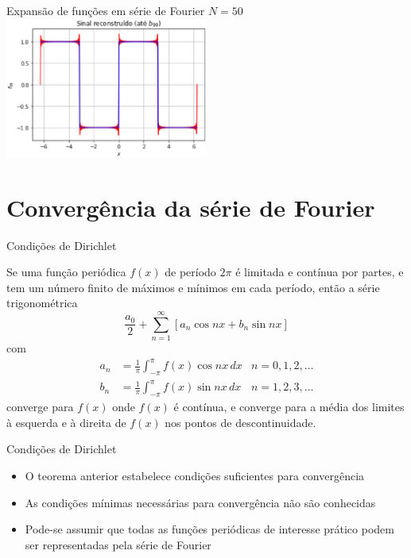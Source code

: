 \begin{slide}[toc=]{Expansão de funções em série de Fourier}
{		      $N=50$~\includegraphics[width=0.5\textwidth]{figs/b99}
		      }
      \end{slide}

      \section[slide=true]{Convergência da série de Fourier}
      \begin{slide}[toc=]{Condições de Dirichlet}
	      \begin{theorem}
		      Se uma função periódica $f(x)$ de período $2\pi$ é limitada e contínua por partes, e tem um número finito de máximos e mínimos em cada período, então a série trigonométrica
			      \begin{equation*}
				      \frac{a_0}{2}+ \sum_{n=1}^\infty \left [ a_n\cos nx  + b_n\sin nx \right ]
			      \end{equation*}
		com 
					      \begin{align*}
						      a_n &= \frac{1}{\pi}\int_{-\pi}^\pi f(x)\cos nx\, dx & n=0,1,2,\dots\\
						      b_n &= \frac{1}{\pi}\int_{-\pi}^\pi f(x)\sin nx\, dx & n=1,2,3,\dots
					      \end{align*}
			converge para $f(x)$ onde $f(x)$ é contínua, e converge para a média dos limites à esquerda e à direita de $f(x)$ nos pontos de descontinuidade.
	      \end{theorem}
      \end{slide}
      
      \begin{slide}[toc=]{Condições de Dirichlet}
         \begin{itemize}
		 \item O teorema anterior estabelece \alert{condições suficientes} para convergência\pause
		 \item As condições mínimas necessárias para convergência não são conhecidas\pause
		 \item Pode-se assumir que \alert{todas as funções periódicas de interesse prático podem ser representadas pela série de Fourier}
         \end{itemize}
      \end{slide}

